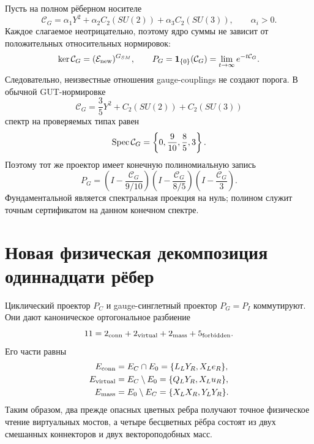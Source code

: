 Пусть на полном рёберном носителе
\begin{equation}
 \mathcal C_G=\alpha_1Y^2+\alpha_2C_2(SU(2))
 +\alpha_3C_2(SU(3)),\qquad \alpha_i>0.
 \label{eq:v7-color-selector-positive-casimir}
\end{equation}
Каждое слагаемое неотрицательно, поэтому ядро суммы не зависит от
положительных относительных нормировок:
\begin{equation}
 \ker\mathcal C_G=(\mathcal E_{\rm new})^{G_{SM}},
 \qquad
 P_G=\mathbf1_{\{0\}}(\mathcal C_G)
 =\lim_{t\to\infty}e^{-t\mathcal C_G}.
 \label{eq:v7-color-selector-kernel-projector}
\end{equation}
Следовательно, неизвестные отношения gauge-couplings не создают порога.
В обычной GUT-нормировке
\begin{equation}
 \mathcal C_G=\frac35Y^2+C_2(SU(2))+C_2(SU(3))
 \label{eq:v7-color-selector-gut-casimir}
\end{equation}
спектр на проверяемых типах равен
\begin{equation}
 \operatorname{Spec}\mathcal C_G=\left\{0,\frac9{10},\frac85,3\right\}.
 \label{eq:v7-color-selector-casimir-spectrum}
\end{equation}
Поэтому тот же проектор имеет конечную полиномиальную запись
\begin{equation}
 P_G=\left(I-\frac{\mathcal C_G}{9/10}\right)
 \left(I-\frac{\mathcal C_G}{8/5}\right)
 \left(I-\frac{\mathcal C_G}{3}\right).
 \label{eq:v7-color-selector-polynomial-projector}
\end{equation}
Фундаментальной является спектральная проекция на нуль; полином служит
точным сертификатом на данном конечном спектре.

\section{Новая физическая декомпозиция одиннадцати рёбер}

Циклический проектор $P_C$ и gauge-синглетный проектор $P_G=P_I$
коммутируют. Они дают каноническое ортогональное разбиение
\begin{equation}
 11=2_{\rm conn}+2_{\rm virtual}+2_{\rm mass}+5_{\rm forbidden}.
 \label{eq:v7-color-selector-edge-partition}
\end{equation}
Его части равны
\begin{align}
 E_{\rm conn}&=E_C\cap E_0=\{L_LY_R,X_Le_R\},\nonumber\\
 E_{\rm virtual}&=E_C\setminus E_0=\{Q_LY_R,X_Lu_R\},\nonumber\\
 E_{\rm mass}&=E_0\setminus E_C=\{X_LX_R,Y_LY_R\}.
 \label{eq:v7-color-selector-four-sector-support}
\end{align}
Таким образом, два прежде опасных цветных ребра получают точное физическое
чтение виртуальных мостов, а четыре бесцветных рёбра состоят из двух
смешанных коннекторов и двух вектороподобных масс.

